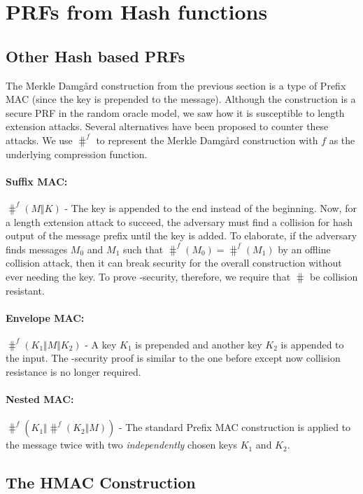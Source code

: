 \section{PRFs from Hash functions}

\subsection{Other Hash based PRFs}
The Merkle Damg{\aa}rd construction from the previous section is a type of Prefix MAC (since the key is prepended to the message). Although the construction is a secure PRF in the random oracle model, we saw how it is susceptible to length extension attacks. Several alternatives have been proposed to counter these attacks. We use $\hash^f$ to represent the Merkle Damg{\aa}rd construction with $f$ as the underlying compression function.  

\paragraph{Suffix MAC:}
$\hash^f(M \Vert K)$ - The key is appended to the end instead of the beginning. Now, for a length extension attack to succeed, the adversary must find a collision for hash output of the message prefix until the key is added. To elaborate, if the adversary finds messages $M_0$ and $M_1$ such that $\hash^f(M_0) = \hash^f(M_1)$ by an offline collision attack, then it can break security for the overall construction without ever needing the key. To prove \PRF-security, therefore, we require that $\hash$ be collision resistant.


\paragraph{Envelope MAC:} $\hash^f(K_1 \Vert M \Vert K_2)$ - A key $K_1$ is prepended and another key $K_2$ is appended to the input. The \PRF-security proof is similar to the one before except now collision resistance is no longer required.

\paragraph{Nested MAC:}
$\hash^f(K_1 \Vert \hash^f(K_2 \Vert M))$ - The standard Prefix MAC construction is applied to the message twice with two \textit{independently} chosen keys $K_1$ and $K_2$.


\subsection{The HMAC Construction}

